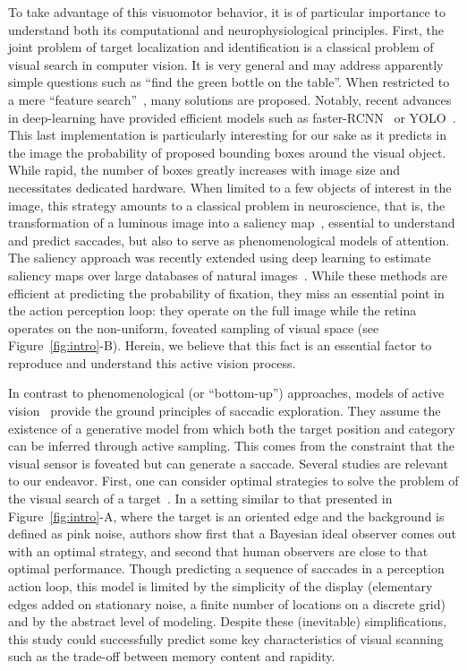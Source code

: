 To take advantage of this visuomotor behavior, it is of particular importance to understand both its computational and neurophysiological principles. First, the joint problem of target localization and identification is a classical problem of visual search in computer vision. It is very general and may address apparently simple questions such as ``find the green bottle on the table''. 
When restricted to a mere ``feature search''~\citep{Treisman80}, many solutions are proposed. Notably, recent advances in deep-learning have provided  efficient models such as faster-RCNN~\citep{Ren17} or YOLO~\citep{Redmon15}. This last implementation is particularly interesting for our sake as it predicts in the image the probability of proposed bounding boxes around the visual object. While rapid, the number of boxes greatly increases with image size and necessitates dedicated hardware. 
When limited to a few objects of interest in the image, this strategy amounts to a classical problem in neuroscience, that is, the transformation of a luminous image into a saliency map~\citep{Itti01}, essential to understand and predict saccades, but also to serve as phenomenological models of attention. The saliency approach was recently extended using deep learning  to estimate saliency maps over large databases of natural images~\citep{Kummerer16}. While these methods are efficient at predicting the probability of fixation, they miss an essential point in the action perception loop: they operate on the full image while the retina operates on the non-uniform, foveated sampling of visual space (see Figure~\ref{fig:intro}-B). Herein, we believe that this fact is an essential factor to reproduce and understand this active vision process.

In contrast to phenomenological (or ``bottom-up'') approaches, models of active vision~\citep{Najemnik05,Butko2010infomax,Friston12} provide the ground principles of saccadic exploration. They assume the existence of a generative model from which both the target position and category can be inferred through active sampling. This comes from the constraint that the visual sensor is foveated but can generate a saccade. 
Several studies are relevant to our endeavor. First, one can consider optimal strategies to solve the problem of the visual search of a target~\citep{Najemnik05}. In a setting similar to that presented in Figure~\ref{fig:intro}-A, where the target is an oriented edge and the background is defined as pink noise, authors show first that a Bayesian ideal observer comes out with an optimal strategy, and second that human observers are close to that optimal performance. Though predicting a sequence of saccades in a perception action loop, this model is limited by the simplicity of the display (elementary edges added on stationary noise, a finite number of locations on a discrete grid) and by the abstract level of modeling. Despite these (inevitable) simplifications, this study could successfully predict some key characteristics of visual scanning such as the trade-off between memory content and rapidity.

